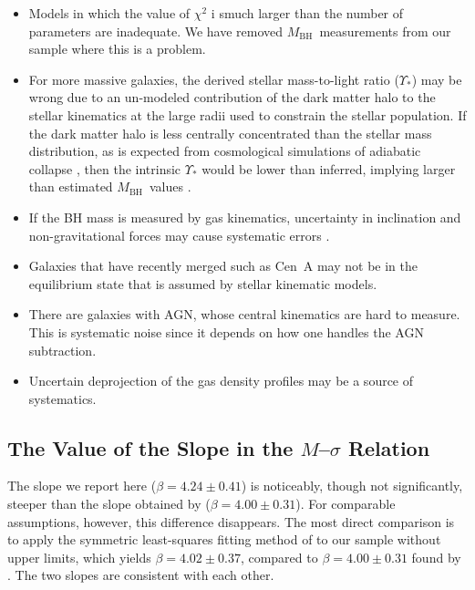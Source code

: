\documentclass[twosided,letterpaper,numberedappendix]{emulateapj}
\newcommand{\msigma}   {\ensuremath{M}{--}\ensuremath{\sigma}}
\newcommand{\mbh}      {\ensuremath{M_{\mathrm{BH}}}}
\newcommand{\msslopeerr} {\ensuremath{4.24 \pm 0.41}}
\begin{document}
\begin{itemize}
\item{Models in which the value of $\chi^2$ i smuch larger than the
number of parameters are inadequate.  We have removed \mbh\
measurements from our sample where this is a problem.}
%
\item{For more massive galaxies, the derived stellar mass-to-light
ratio ($\Upsilon_*$) may be wrong due to an un-modeled contribution of
the dark matter halo to the stellar kinematics at the large radii used
to constrain the stellar population.  If the dark matter halo is less
centrally concentrated than the stellar mass distribution, as is
expected from cosmological simulations of adiabatic collapse
\citep{gnedinetal04}, then the intrinsic $\Upsilon_*$ would be lower
than inferred, implying larger than estimated \mbh\ values
\citep{gt09}.}
%
\item{If the BH mass is measured by gas kinematics, uncertainty in
  inclination and non-gravitational forces may cause systematic errors
  \citep{hoetal02}.}
%
\item{Galaxies that have recently merged such as Cen~A may not be in
  the equilibrium state that is assumed by stellar kinematic models.}
%
\item{There are galaxies with AGN, whose central kinematics are hard
  to measure. This is systematic noise since it depends on how one
  handles the AGN subtraction.}
%
\item{Uncertain deprojection of the gas density profiles may be a
source of systematics.}
\end{itemize}



\subsection{The Value of the Slope in the \texorpdfstring{\msigma}{M-sigma} 
Relation}
\label{flatness}
The slope we report here ($\beta = \msslopeerr$) is noticeably,
though not significantly, steeper than the slope obtained by
\citet{tremaineetal02} ($\beta = 4.00 \pm 0.31$).  For comparable assumptions, however, this
difference disappears.  The most direct comparison is to apply the
symmetric least-squares fitting method of \citet[][see
Table~\ref{t:fits}]{tremaineetal02} to our sample without upper
limits, which yields $\beta = 4.02 \pm 0.37$, compared to $\beta =
4.00 \pm 0.31$ found by \citet{tremaineetal02}.  The two slopes are
consistent with each other.
\end{document}
